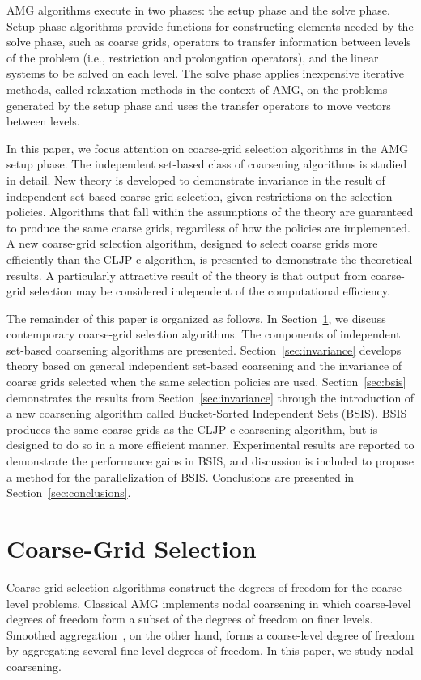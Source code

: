 \documentclass{elsart}
\begin{document}
AMG algorithms execute in two phases: the setup phase and the solve
phase. Setup phase algorithms provide functions for constructing
elements needed by the solve phase, such as coarse grids, operators to
transfer information between levels of the problem (i.e., restriction
and prolongation operators), and the linear systems to be solved on
each level. The solve phase applies inexpensive iterative methods,
called relaxation methods in the context of AMG, on the problems
generated by the setup phase and uses the transfer operators to move
vectors between levels.

In this paper, we focus attention on coarse-grid selection algorithms
in the AMG setup phase. The independent set-based class of coarsening
algorithms is studied in detail. New theory is developed to
demonstrate invariance in the result of independent set-based coarse
grid selection, given restrictions on the selection
policies. Algorithms that fall within the assumptions of the theory
are guaranteed to produce the same coarse grids, regardless of how the
policies are implemented. A new coarse-grid selection algorithm,
designed to select coarse grids more efficiently than the CLJP-c
algorithm, is presented to demonstrate the theoretical results. A
particularly attractive result of the theory is that output from coarse-grid
selection may be considered independent of the computational efficiency.

The remainder of this paper is organized as follows. In
Section~\ref{sec:cgs}, we discuss contemporary coarse-grid selection
algorithms. The components of independent set-based coarsening
algorithms are presented. Section~\ref{sec:invariance} develops theory
based on general independent set-based coarsening and the invariance
of coarse grids selected when the same selection policies are
used. Section~\ref{sec:bsis} demonstrates the results from
Section~\ref{sec:invariance} through the introduction of a new
coarsening algorithm called Bucket-Sorted Independent Sets
(BSIS). BSIS produces the same coarse grids as the CLJP-c coarsening
algorithm, but is designed to do so in a more efficient
manner. Experimental results are reported to demonstrate the
performance gains in BSIS, and discussion is included to propose a
method for the parallelization of BSIS. Conclusions are presented in
Section~\ref{sec:conclusions}.

\section{Coarse-Grid Selection}
\label{sec:cgs}
Coarse-grid selection algorithms construct the degrees of freedom for
the coarse-level problems. Classical AMG implements nodal coarsening
in which coarse-level degrees of freedom form a subset of the degrees
of freedom on finer levels. Smoothed
aggregation~\cite{Vanek1996,Vanek2001,brezina2005}, on the other hand,
forms a coarse-level degree of freedom by aggregating several
fine-level degrees of freedom. In this paper, we study nodal
coarsening.
\end{document}
